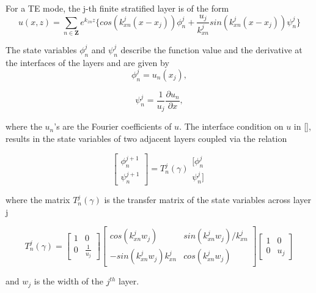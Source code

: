 For a TE mode, the j-th finite stratified layer is of the form
\begin{equation}
u(x,z) = \sum_{n \in \mathbf{Z}} e^{k_{zn} z} \{cos(k_{xn}^j(x-x_j))
\phi_n^j + \frac{u_j}{k_{xn}^j} sin(k_{xn}^j(x-x_j))\psi_n^j \}
\end{equation}

The state variables $\phi_n^j$ and $\psi_n^j$ describe the function
value and the derivative at the interfaces of the layers and are given
by
\begin{equation}
\phi_n^j = u_n(x_j),
\end{equation}

\begin{equation}
\psi_n^j = \frac{1}{u_j} \frac{\partial{u_n}}{\partial{x}},
\end{equation}

where the $u_n$'s are the Fourier coefficients of $u$. The interface
condition on $u$ in \ref{}, results in the state variables of two
adjacent layers coupled via the relation

\begin{equation}
\left[ \begin{array}{ll} \phi_n^{j+1} \\ \psi_n^{j+1}
\end{array} \right] = T_n^j(\gamma)
\begin{array}{ll} [\phi_n^{j} \\ \psi_n^{j}] \end{array}
\end{equation}

where the matrix $T_n^j(\gamma)$ is the transfer matrix of the state
variables across layer j

\begin{equation}
T_n^j(\gamma) = \left[ \begin{array}{cc} 1 & 0 \\
0 & \frac{1}{u_j} \end{array} \right]
\left[ \begin{array}{cc}  cos(k_{xn}^j w_j) & sin(k_{xn}^j
 w_j)/k_{xn}^j \\
-sin(k_{xn}^j w_j) k_{xn}^j & cos(k_{xn}^j w_j) \end{array}
\right]\left[ \begin{array}{cc} 1 & 0 \\
0 & u_j \end{array} \right]
\end{equation}

and $w_j$ is the width of the $j^{th}$ layer.

